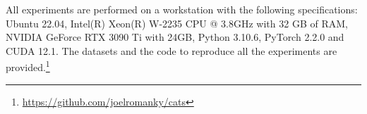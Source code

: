 All experiments are performed on a workstation with the following specifications: Ubuntu 22.04, Intel(R) Xeon(R) W-2235 CPU @ 3.8GHz with 32 GB of RAM, NVIDIA GeForce RTX 3090 Ti with 24GB, Python 3.10.6, PyTorch 2.2.0 and CUDA 12.1. The datasets and the code to reproduce all the experiments are provided.\footnote{\url{https://github.com/joelromanky/cats}}







